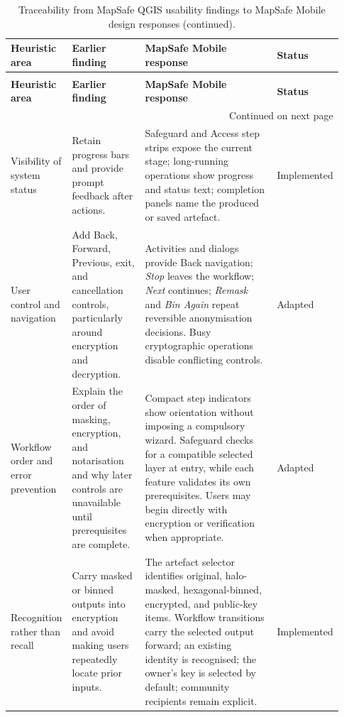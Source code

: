\documentclass[]{interact}
\begin{document}
{\footnotesize
\setlength{\tabcolsep}{3pt}
\renewcommand{\arraystretch}{1.1}
\begin{longtable}{@{}p{0.16\linewidth}p{0.22\linewidth}p{0.40\linewidth}p{0.15\linewidth}@{}}
\caption{Traceability from MapSafe QGIS usability findings to MapSafe Mobile design responses.}
\label{tab:usability-traceability}\\
\toprule
\textbf{Heuristic area} & \textbf{Earlier finding} & \textbf{MapSafe Mobile response} & \textbf{Status} \\
\midrule
\endfirsthead
\caption[]{Traceability from MapSafe QGIS usability findings to MapSafe Mobile design responses (continued).}\\
\toprule
\textbf{Heuristic area} & \textbf{Earlier finding} & \textbf{MapSafe Mobile response} & \textbf{Status} \\
\midrule
\endhead
\midrule
\multicolumn{4}{r}{\scriptsize Continued on next page}\\
\endfoot
\bottomrule
\endlastfoot

Visibility of system status & Retain progress bars and provide prompt feedback after actions. & Safeguard and Access step strips expose the current stage; long-running operations show progress and status text; completion panels name the produced or saved artefact. & Implemented \\

User control and navigation & Add Back, Forward, Previous, exit, and cancellation controls, particularly around encryption and decryption. & Activities and dialogs provide Back navigation; \emph{Stop} leaves the workflow; \emph{Next} continues; \emph{Remask} and \emph{Bin Again} repeat reversible anonymisation decisions. Busy cryptographic operations disable conflicting controls. & Adapted \\

Workflow order and error prevention & Explain the order of masking, encryption, and notarisation and why later controls are unavailable until prerequisites are complete. & Compact step indicators show orientation without imposing a compulsory wizard. Safeguard checks for a compatible selected layer at entry, while each feature validates its own prerequisites. Users may begin directly with encryption or verification when appropriate. & Adapted \\

Recognition rather than recall & Carry masked or binned outputs into encryption and avoid making users repeatedly locate prior inputs. & The artefact selector identifies original, halo-masked, hexagonal-binned, encrypted, and public-key items. Workflow transitions carry the selected output forward; an existing identity is recognised; the owner's key is selected by default; community recipients remain explicit. & Implemented \\


\end{longtable}}
\end{document}
